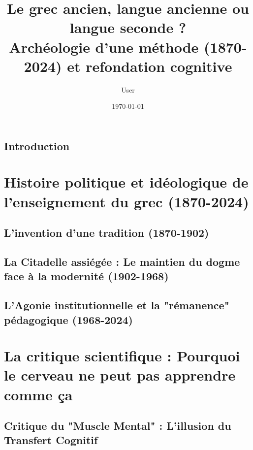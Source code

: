 \documentclass[a4paper,12pt,twoside]{report}
\title{Le grec ancien, langue ancienne ou langue seconde ? \\ \large Archéologie d'une méthode (1870-2024) et refondation cognitive}
\author{User}
\date{\today}
\begin{document}
\maketitle
\tableofcontents

\chapter*{Introduction}






\part{Histoire politique et idéologique de l'enseignement du grec (1870-2024)}

\chapter{L'invention d'une tradition (1870-1902)}




\chapter{La Citadelle assiégée : Le maintien du dogme face à la modernité (1902-1968)}




\chapter{L'Agonie institutionnelle et la "rémanence" pédagogique (1968-2024)}




\part{La critique scientifique : Pourquoi le cerveau ne peut pas apprendre comme ça}

\chapter{Critique du "Muscle Mental" : L'illusion du Transfert Cognitif}



\end{document}
